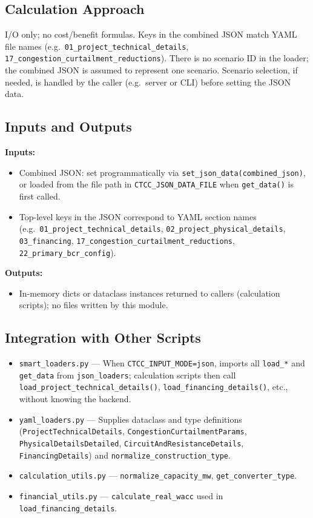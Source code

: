 \documentclass[ctcc_full_documentation.tex]{subfiles}
\begin{document}
\subsection{Calculation Approach}

I/O only; no cost/benefit formulas. Keys in the combined JSON match YAML file names (e.g.\ \texttt{01\_project\_technical\_details}, \texttt{17\_congestion\_curtailment\_reductions}). There is no scenario ID in the loader; the combined JSON is assumed to represent one scenario. Scenario selection, if needed, is handled by the caller (e.g.\ server or CLI) before setting the JSON data.

\subsection{Inputs and Outputs}

\textbf{Inputs:}
\begin{itemize}
    \item Combined JSON: set programmatically via \texttt{set\_json\_data(combined\_json)}, or loaded from the file path in \texttt{CTCC\_JSON\_DATA\_FILE} when \texttt{get\_data()} is first called.
    \item Top-level keys in the JSON correspond to YAML section names (e.g.\ \texttt{01\_project\_technical\_details}, \texttt{02\_project\_physical\_details}, \texttt{03\_financing}, \texttt{17\_congestion\_curtailment\_reductions}, \texttt{22\_primary\_bcr\_config}).
\end{itemize}

\textbf{Outputs:}
\begin{itemize}
    \item In-memory dicts or dataclass instances returned to callers (calculation scripts); no files written by this module.
\end{itemize}

\subsection{Integration with Other Scripts}

\begin{itemize}
    \item \texttt{smart\_loaders.py} --- When \texttt{CTCC\_INPUT\_MODE=json}, imports all \texttt{load\_*} and \texttt{get\_data} from \texttt{json\_loaders}; calculation scripts then call \texttt{load\_project\_technical\_details()}, \texttt{load\_financing\_details()}, etc., without knowing the backend.
    \item \texttt{yaml\_loaders.py} --- Supplies dataclass and type definitions (\texttt{ProjectTechnicalDetails}, \texttt{CongestionCurtailmentParams}, \texttt{PhysicalDetailsDetailed}, \texttt{CircuitAndResistanceDetails}, \texttt{FinancingDetails}) and \texttt{normalize\_construction\_type}.
    \item \texttt{calculation\_utils.py} --- \texttt{normalize\_capacity\_mw}, \texttt{get\_converter\_type}.
    \item \texttt{financial\_utils.py} --- \texttt{calculate\_real\_wacc} used in \texttt{load\_financing\_details}.
\end{itemize}
\end{document}
